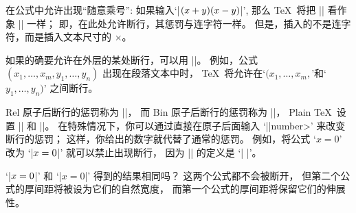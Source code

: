 \danger 在公式中允许出现``随意乘号'':
如果输入`|$(x+y)\*(x-y)$|', 那么 \TeX\ 将把 |\*| 看作象 \hbox{|\-|} 一样；
即，在此处允许断行，其惩罚与连字符一样。%
但是，插入的不是连字符，而是插入文本尺寸的 $\times$。

\danger \1如果的确要允许在外层的某处断行，可以用 |\allowbreak|。%
例如，公式
\begintt
$(x_1,\ldots,x_m,\allowbreak y_1,\ldots,y_n)$
\endtt
出现在段落文本中时， \TeX\ 将允许在`$(x_1,\ldots,x_m,$'和`$y_1,\ldots,y_n)$'%
之间断行。

\ddanger Rel 原子后断行的惩罚称为 |\relpenalty|，
而 Bin 原子后断行的惩罚称为 |\binoppenalty|，
Plain \TeX\ 设置 || 和 ||。
在特殊情况下，你可以通过直接在原子后面输入
`|\penalty|\<number>' 来改变断行的惩罚；
这样，你给出的数字就代替了通常的惩罚。
例如，将公式 `$x=0$' 改为 `|$x=\nobreak0$|' 就可以禁止出现断行，
因为 |\nobreak| 的定义是 `| |'。

\ddangerexercise `|$x=\nobreak0$|' 和 `|${x=0}$|' 得到的结果相同吗？
\answer 这两个公式都不会被断开，
但第二个公式的厚间距将被设为它们的自然宽度，
而第一个公式的厚间距将保留它们的伸展性。


